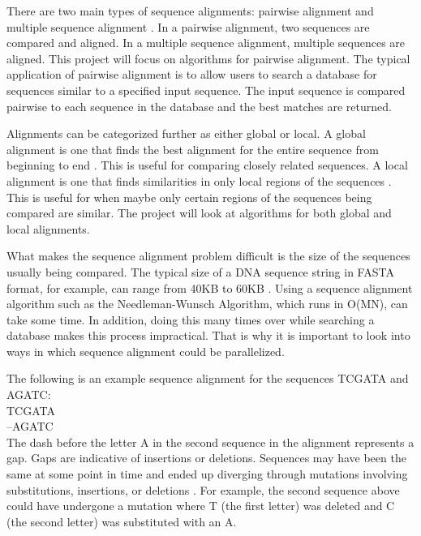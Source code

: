 \documentclass[conference]{IEEEtran}
\begin{document}
There are two main types of sequence alignments: pairwise alignment and multiple sequence alignment \cite{chaudhary_liu_matta_yang_2005}. In a pairwise alignment, two sequences are compared and aligned. In a multiple sequence alignment, multiple sequences are aligned. This project will focus on algorithms for pairwise alignment. The typical application of pairwise alignment is to allow users to search a database for sequences similar to a specified input sequence. The input sequence is compared pairwise to each sequence in the database and the best matches are returned.

Alignments can be categorized further as either global or local. A global alignment is one that finds the best alignment for the entire sequence from beginning to end \cite{global_alignment}. This is useful for comparing closely related sequences. A local alignment is one that finds similarities in only local regions of the sequences \cite{global_alignment}. This is useful for when maybe only certain regions of the sequences being compared are similar. The project will look at algorithms for both global and local alignments.

What makes the sequence alignment problem difficult is the size of the sequences usually being compared. The typical size of a DNA sequence string in FASTA format, for example, can range from 40KB to 60KB \cite{naveed_siddiqui_ahmed}. Using a sequence alignment algorithm such as the Needleman-Wunsch Algorithm, which runs in O(MN), can take some time. In addition, doing this many times over while searching a database makes this process impractical. That is why it is important to look into ways in which sequence alignment could be parallelized.

The following is an example sequence alignment for the sequences TCGATA and AGATC:\\

\hspace*{1em}TCGATA\\
\hspace*{2em}–AGATC\\
 
The dash before the letter A in the second sequence in the alignment represents a gap. Gaps are indicative of insertions or deletions. Sequences may have been the same at some point in time and ended up diverging through mutations involving substitutions, insertions, or deletions \cite{settles_2008}. For example, the second sequence above could have undergone a mutation where T (the first letter) was deleted and C (the second letter) was substituted with an A.
\end{document}
